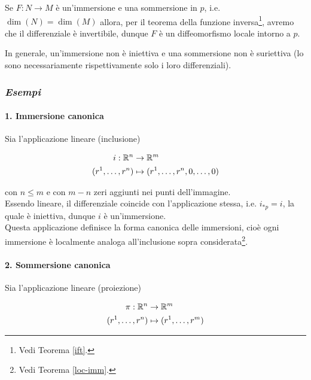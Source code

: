 \begin{remark}
	Se $ F : N \to M $ è un'immersione e una sommersione in $ p $, i.e. $ \dim(N) = \dim(M) $ allora, per il teorema della funzione inversa\footnote{%
		Vedi Teorema \ref{ift}.%
	}, avremo che il differenziale è invertibile, dunque $ F $ è un diffeomorfismo locale intorno a $ p $.
\end{remark}

\begin{remark}
	In generale, un'immersione non è iniettiva e una sommersione non è suriettiva (lo sono necessariamente rispettivamente solo i loro differenziali).
\end{remark}

\subsubsection{\textit{Esempi}}

\paragraph{1. Immersione canonica}

Sia l'applicazione lineare (inclusione)

\begin{align}
	\begin{split}
		i : \mathbb{R}^{n} &\to \mathbb{R}^{m}\\
		(r^{1},\dots,r^{n}) &\mapsto (r^{1},\dots,r^{n},0,\dots,0)
	\end{split}
\end{align}

con $ n \leqslant m $ e con $ m-n $ zeri aggiunti nei punti dell'immagine.\\
Essendo lineare, il differenziale coincide con l'applicazione stessa, i.e. $ i_{*p} = i $, la quale è iniettiva, dunque $ i $ è un'immersione.\\
Questa applicazione definisce la forma canonica delle immersioni, cioè ogni immersione è localmente analoga all'inclusione sopra considerata\footnote{%
	Vedi Teorema \ref{loc-imm}.%
}.

\paragraph{2. Sommersione canonica}

Sia l'applicazione lineare (proiezione)

\begin{align}
	\begin{split}
		\pi : \mathbb{R}^{n} &\to \mathbb{R}^{m}\\
		(r^{1},\dots,r^{n}) &\mapsto (r^{1},\dots,r^{m})
	\end{split}
\end{align}

